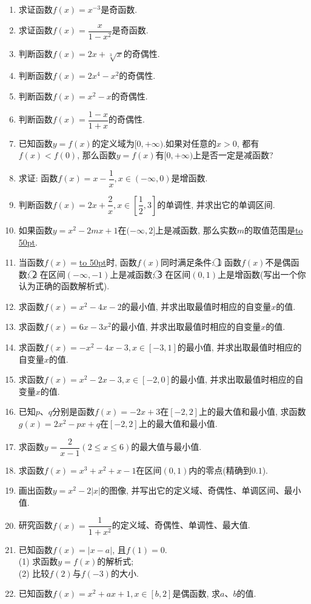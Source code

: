 \documentclass[10pt,a4paper]{article}
\newcommand{\blank}[1]{\underline{\hbox to #1pt{}}}
\begin{document}
\begin{enumerate}[1.]
\item 求证函数$f(x)=x^{-3}$是奇函数.
\item 求证函数$f(x)=\dfrac x{1-x^2}$是奇函数.
\item 判断函数$f(x)=2x+\sqrt[3]x$的奇偶性.
\item 判断函数$f(x)=2x^4-x^2$的奇偶性.
\item 判断函数$f(x)=x^2-x$的奇偶性.
\item 判断函数$f(x)=\dfrac{1-x}{1+x}$的奇偶性.
\item 已知函数$y=f(x)$的定义域为$[0,+\infty)$.如果对任意的$x>0$, 都有$f(x)<f(0)$, 那么函数$y=f(x)$有$[0,+\infty)$上是否一定是减函数?
\item 求证: 函数$f(x)=x-\dfrac 1x,x\in (-\infty ,0)$是增函数.
\item 判断函数$f(x)=2x+\dfrac 2x,x\in [\dfrac 12,3]$的单调性, 并求出它的单调区间.
\item 如果函数$y=x^2-2mx+1$在$(-\infty ,2]$上是减函数, 那么实数$m$的取值范围是\blank{50}.
\item 当函数$f(x)=$\blank{50}时, 函数$f(x)$同时满足条件: \textcircled{1} 函数$f(x)$不是偶函数; \textcircled{2} 在区间$(-\infty ,-1)$上是减函数; \textcircled{3} 在区间$(0,1)$上是增函数(写出一个你认为正确的函数解析式).
\item 求函数$f(x)=x^2-4x-2$的最小值, 并求出取最值时相应的自变量$x$的值.
\item 求函数$f(x)=6x-3x^2$的最小值, 并求出取最值时相应的自变量$x$的值.
\item 求函数$f(x)=-x^2-4x-3,x\in [-3,1]$的最小值, 并求出取最值时相应的自变量$x$的值.
\item 求函数$f(x)=x^2-2x-3,x\in [-2,0]$的最小值, 并求出取最值时相应的自变量$x$的值.
\item 已知$p$、$q$分别是函数$f(x)=-2x+3$在$[-2,2]$上的最大值和最小值, 求函数$g(x)=2x^2-px+q$在$[-2,2]$上的最大值和最小值.
\item 求函数$y=\dfrac 2{x-1}(2\le x\le 6)$的最大值与最小值.
\item 求函数$f(x)=x^3+x^2+x-1$在区间$(0,1)$内的零点(精确到$0.1$).
\item 画出函数$y=x^2-2|x|$的图像, 并写出它的定义域、奇偶性、单调区间、最小值.
\item 研究函数$f(x)=\dfrac 1{1+x^2}$的定义域、奇偶性、单调性、最大值.
\item 已知函数$f(x)=|x-a|$, 且$f(1)=0$.\\
(1) 求函数$y=f(x)$的解析式;\\
(2) 比较$f(2)$与$f(-3)$的大小.
\item 已知函数$f(x)=x^2+ax+1,x\in [b,2]$是偶函数, 求$a$、$b$的值.

\end{enumerate}
\end{document}
